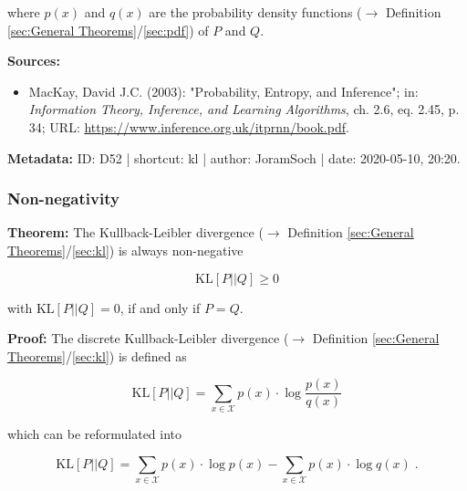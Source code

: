 \documentclass[a4paper,12pt,twoside]{book}
\begin{document}
where $p(x)$ and $q(x)$ are the probability density functions ($\rightarrow$ Definition \ref{sec:General Theorems}/\ref{sec:pdf}) of $P$ and $Q$.


\vspace{1em}
\textbf{Sources:}
\begin{itemize}
\item MacKay, David J.C. (2003): "Probability, Entropy, and Inference"; in: \textit{Information Theory, Inference, and Learning Algorithms}, ch. 2.6, eq. 2.45, p. 34; URL: \url{https://www.inference.org.uk/itprnn/book.pdf}.
\end{itemize}


\vspace{1em}
\textbf{Metadata:} ID: D52 | shortcut: kl | author: JoramSoch | date: 2020-05-10, 20:20.
\vspace{1em}



\subsubsection[\textbf{Non-negativity}]{Non-negativity} \label{sec:kl-nonneg}
\setcounter{equation}{0}

\textbf{Theorem:} The Kullback-Leibler divergence ($\rightarrow$ Definition \ref{sec:General Theorems}/\ref{sec:kl}) is always non-negative

\begin{equation} \label{eq:kl-nonneg-KL-nonneg}
\mathrm{KL}[P||Q] \geq 0
\end{equation}

with $\mathrm{KL}[P \vert \vert Q] = 0$, if and only if $P = Q$.


\vspace{1em}
\textbf{Proof:} The discrete Kullback-Leibler divergence ($\rightarrow$ Definition \ref{sec:General Theorems}/\ref{sec:kl}) is defined as

\begin{equation} \label{eq:kl-nonneg-KL}
\mathrm{KL}[P||Q] = \sum_{x \in \mathcal{X}} p(x) \cdot \log \frac{p(x)}{q(x)}
\end{equation}

which can be reformulated into

\begin{equation} \label{eq:kl-nonneg-KL-dev}
\mathrm{KL}[P||Q] = \sum_{x \in \mathcal{X}} p(x) \cdot \log p(x) - \sum_{x \in \mathcal{X}} p(x) \cdot \log q(x) \; .
\end{equation}
\end{document}
